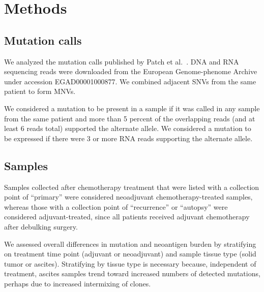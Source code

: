 \section*{Methods}

\subsection*{Mutation calls}
We analyzed the mutation calls published by Patch et al.~\cite{Patch_2015}. DNA and RNA sequencing reads were downloaded from the European Genome-phenome Archive under accession EGAD00001000877. We combined adjacent SNVs from the same patient to form MNVs.


We considered a mutation to be present in a sample if it was called in any sample from the same patient and more than 5 percent of the overlapping reads (and at least 6 reads total) supported the alternate allele. We considered a mutation to be expressed if there were 3 or more RNA reads supporting the alternate allele.

\subsection*{Samples}
Samples collected after chemotherapy treatment that were listed with a collection point of ``primary'' were considered neoadjuvant chemotherapy-treated samples, whereas those with a collection point of ``recurrence'' or ``autopsy'' were considered adjuvant-treated, since all patients received adjuvant chemotherapy after debulking surgery.

We assessed overall differences in mutation and neoantigen burden by stratifying on treatment time point (adjuvant or neoadjuvant) and sample tissue type (solid tumor or ascites). Stratifying by tissue type is necessary because, independent of treatment, ascites samples trend toward increased numbers of detected mutations, perhaps due to increased intermixing of clones.



